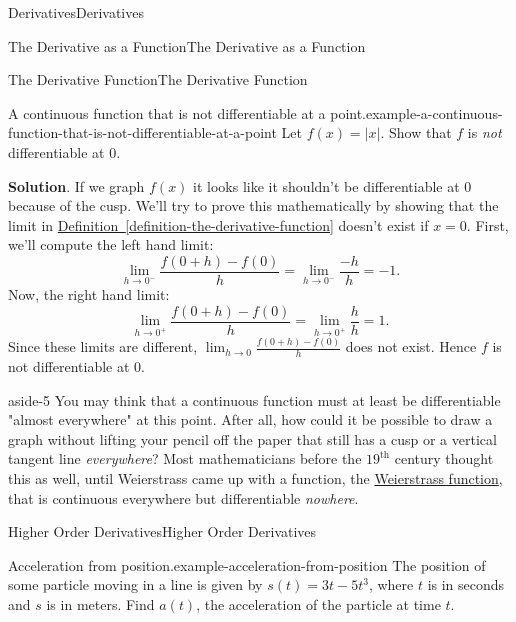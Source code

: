 \documentclass[10pt,]{book}
\numberwithin{equation}{section}
\begin{document}
\begin{chapterptx}{Derivatives}{}{Derivatives}{}{}
\begin{sectionptx}{The Derivative as a Function}{}{The Derivative as a Function}{}{}
\begin{subsectionptx}{The Derivative Function}{}{The Derivative Function}{}{}
\begin{example}{A continuous function that is not differentiable at a point.}{example-a-continuous-function-that-is-not-differentiable-at-a-point}
\hypertarget{p-113}{}%
Let \(f(x) = |x|\). Show that \(f\) is \emph{not} differentiable at \(0\).%
\par\smallskip%
\noindent\textbf{Solution}.\hypertarget{solution-24}{}\quad%
\hypertarget{p-114}{}%
If we graph \(f(x)\) it looks like it shouldn't be differentiable at \(0\) because of the cusp. We'll try to prove this mathematically by showing that the limit in \hyperref[definition-the-derivative-function]{Definition~\ref{definition-the-derivative-function}} doesn't exist if \(x=0\). First, we'll compute the left hand limit:%
\begin{equation*}
\lim_{h\to0^{-}}\frac{f(0+h)-f(0)}{h} = \lim_{h\to0^{-}}\frac{-h}{h} = -1.
\end{equation*}
Now, the right hand limit:%
\begin{equation*}
\lim_{h\to0^{+}}\frac{f(0+h)-f(0)}{h} = \lim_{h\to0^{+}}\frac{h}{h} = 1.
\end{equation*}
Since these limits are different, \(\lim_{h\to0}\frac{f(0+h)-f(0)}{h}\) does not exist. Hence \(f\) is not differentiable at \(0\).%
\end{example}
\begin{aside}{}{aside-5}%
\hypertarget{p-115}{}%
You may think that a continuous function must at least be differentiable "almost everywhere" at this point. After all, how could it be possible to draw a graph without lifting your pencil off the paper that still has a cusp or a vertical tangent line \emph{everywhere}? Most mathematicians before the \(19^{\text{th}}\) century thought this as well, until Weierstrass came up with a function, the \href{https://en.wikipedia.org/wiki/Weierstrass_function}{Weierstrass function}, that is continuous everywhere but differentiable \emph{nowhere}.%
\end{aside}
\end{subsectionptx}
%
%
\typeout{************************************************}
\typeout{************************************************}
%
\begin{subsectionptx}{Higher Order Derivatives}{}{Higher Order Derivatives}{}{}\label{subsection-higher-order-derivatives}
\begin{example}{Acceleration from position.}{example-acceleration-from-position}%
\hypertarget{p-116}{}%
The position of some particle moving in a line is given by \(s(t) = 3t-5t^{3}\), where \(t\) is in seconds and \(s\) is in meters. Find \(a(t)\), the acceleration of the particle at time \(t\).%
\par\smallskip%

\end{example}
\end{subsectionptx}
\end{sectionptx}
\end{chapterptx}
\end{document}
